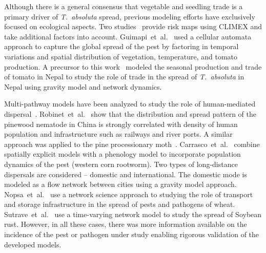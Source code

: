 \documentclass[11pt]{article}
\newcommand{\tuta}{\emph{T.~absoluta}}
\theoremstyle{definition}
\begin{document}
Although there is a general consensus that vegetable and seedling trade is a
primary driver of \tuta{} spread, previous modeling efforts have
exclusively focused on ecological aspects. Two
studies~\cite{desneux2010biological,tonnang2015identification} provide risk
maps using CLIMEX and take additional factors into account.
Guimapi~et~al.~\cite{guimapi2016modeling} used a
cellular automata approach to capture the global spread of the pest by
factoring in temporal variations and spatial distribution of vegetation,
temperature, and tomato production. 
A precursor to this work~\cite{venkatramanan2017towards} modeled the seasonal
production and trade of tomato in Nepal to study the role of trade in the
spread of \tuta{} in Nepal using gravity model and network dynamics. 

Multi-pathway models
have been analyzed to study the role of human-mediated
dispersal~\cite{robinet2009role,robinet2012human,carrasco2010unveiling}.
Robinet~et~al.~\cite{robinet2009role} show that the distribution and spread
pattern of the pinewood nematode in China is strongly correlated with
density of human population and infrastructure such as railways and river
ports. A similar approach was applied to the pine processionary
moth~\cite{robinet2012human}.  Carrasco~et~al.~\cite{carrasco2010unveiling}
combine spatially explicit models with a phenology model to incorporate
population dynamics of the pest (western corn rootworm). Two types of
long-distance dispersals are considered -- domestic and international. The
domestic mode is modeled as a flow network between cities using a gravity
model approach. 
Nopsa~et~al.~\cite{nopsa2015ecological} use a network science approach to
studying the role of transport and storage infrastructure in the spread of
pests and pathogens of wheat. Sutrave~et~al.~\cite{sutrave2012identifying}
use a time-varying network model to study the spread of Soybean rust.
However, in all these cases, there was more information available on the
incidence of the pest or pathogen under study enabling rigorous validation of the
developed models.
\end{document}
